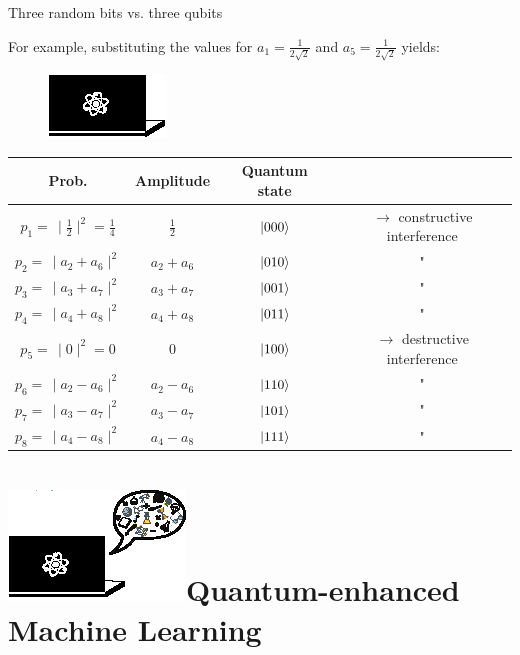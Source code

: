 \documentclass[10pt]{beamer}
\begin{document}
{
\begin{frame}[fragile]{Three random bits vs. three qubits}

For example, substituting the values for $a_1 = \frac{1}{2\sqrt{2}}$ and $a_5 = \frac{1}{2\sqrt{2}}$ yields:
\centering
\begin{figure}
\includegraphics[scale=1.2]{Vectors/laptop_q.eps}\\
\end{figure}
\vspace{0.5cm}
\begin{table}
\begin{tabular}{c | c | c c}
	Prob. & Amplitude & Quantum state &  \\
	\midrule
	$p_1 = \,\mid \frac{1}{2} \mid^2 = \frac{1}{4}$ & $\frac{1}{2}$ & $\ket{000}$ & $\rightarrow$ constructive interference \\
	$p_2 =\, \mid a_2+a_6 \mid^2$ & $a_2+a_6$ & $\ket{010}$ & " \\
	$p_3 = \,\mid a_3+a_7 \mid^2$ & $a_3+a_7$ & $\ket{001}$ & "\\
	$p_4 = \,\mid a_4+a_8 \mid^2$ & $a_4+a_8$ & $\ket{011}$ & "\\
	$p_5 = \,\mid 0 \mid^2 = 0$ & $0$ & $\ket{100}$ & $\rightarrow$ destructive interference \\
	$p_6 = \,\mid a_2-a_6 \mid^2$ & $a_2-a_6$ & $\ket{110}$ & "\\
	$p_7 = \,\mid a_3-a_7 \mid^2$ & $a_3-a_7$ & $\ket{101}$ & "\\
	$p_8 = \,\mid a_4-a_8 \mid^2$ & $a_4-a_8$ & $\ket{111}$ & "\\
	
\end{tabular}
\end{table}

\end{frame}
}


\section*{\protect\includegraphics[scale=2.4]{Vectors/laptop_qml.eps}\newline Quantum-enhanced Machine Learning}
\end{document}
